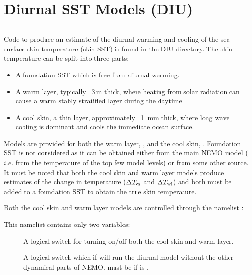 \documentclass[../tex_main/NEMO_manual]{subfiles}
\begin{document}
\chapter{Diurnal SST Models (DIU)}
\label{chap:DIU}

\minitoc


\newpage
$\ $\newline %

Code to produce an estimate of the diurnal warming and cooling of the sea surface skin
temperature (skin SST) is found in the DIU directory.  
The skin temperature can be split into three parts:
\begin{itemize}
\item
  A foundation SST which is free from diurnal warming.
\item
  A warm layer, typically ~3\,m thick,
  where heating from solar radiation can cause a warm stably stratified layer during the daytime
\item
  A cool skin, a thin layer, approximately ~1\, mm thick,
  where long wave cooling is dominant and cools the immediate ocean surface.
\end{itemize}

Models are provided for both the warm layer, , and the cool skin, .
Foundation SST is not considered as it can be obtained either from the main NEMO model
($i.e.$ from the temperature of the top few model levels) or from some other source.  
It must be noted that both the cool skin and warm layer models produce estimates of the change in temperature
($\Delta T_{\rm{cs}}$ and $\Delta T_{\rm{wl}}$) and
both must be added to a foundation SST to obtain the true skin temperature.

Both the cool skin and warm layer models are controlled through the namelist :

This namelist contains only two variables:
\begin{description}
\item[]
  A logical switch for turning on/off both the cool skin and warm layer.
\item[]
  A logical switch which if  will run the diurnal model without the other dynamical parts of NEMO.
   must be  if  is .
\end{description}
\end{document}

